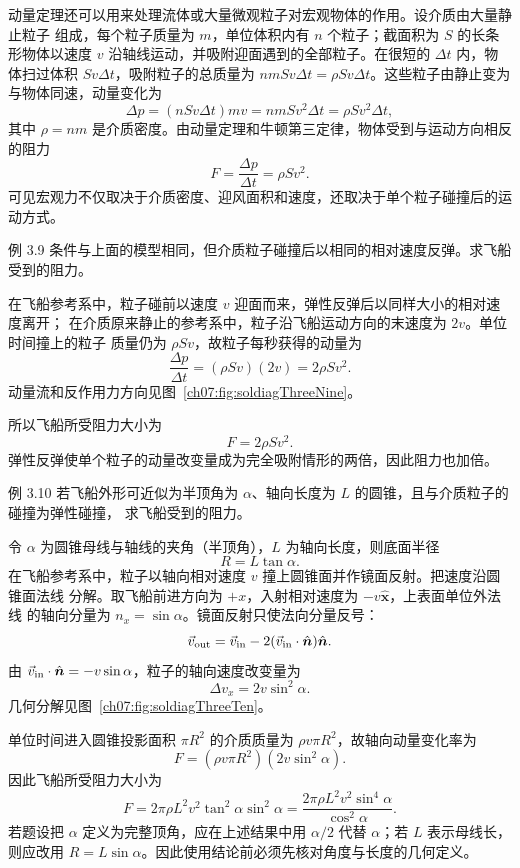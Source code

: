 动量定理还可以用来处理流体或大量微观粒子对宏观物体的作用。设介质由大量静止粒子
组成，每个粒子质量为 $m$，单位体积内有 $n$ 个粒子；截面积为 $S$ 的长条形物体以速度
$v$ 沿轴线运动，并吸附迎面遇到的全部粒子。在很短的 $\Delta t$ 内，物体扫过体积
$Sv\Delta t$，吸附粒子的总质量为 $nmSv\Delta t=\rho Sv\Delta t$。这些粒子由静止变为
与物体同速，动量变化为
\begin{equation}
 \Delta p=(nSv\Delta t)mv=nmSv^2\Delta t
 =\rho Sv^2\Delta t,
\end{equation}
其中 $\rho=nm$ 是介质密度。由动量定理和牛顿第三定律，物体受到与运动方向相反的阻力
\begin{equation}
 F=\frac{\Delta p}{\Delta t}=\rho Sv^2.
\end{equation}
可见宏观力不仅取决于介质密度、迎风面积和速度，还取决于单个粒子碰撞后的运动方式。

\begin{origexamplebox}{例 3.9}
条件与上面的模型相同，但介质粒子碰撞后以相同的相对速度反弹。求飞船受到的阻力。
\end{origexamplebox}

\begin{xesolution}
在飞船参考系中，粒子碰前以速度 $v$ 迎面而来，弹性反弹后以同样大小的相对速度离开；
在介质原来静止的参考系中，粒子沿飞船运动方向的末速度为 $2v$。单位时间撞上的粒子
质量仍为 $\rho Sv$，故粒子每秒获得的动量为
\[
 \frac{\Delta p}{\Delta t}=(\rho Sv)(2v)=2\rho Sv^2.
\]
动量流和反作用力方向见图~\ref{ch07:fig:soldiagThreeNine}。

\soldiagThreeNine
所以飞船所受阻力大小为
\[
 \boxed{F=2\rho Sv^2}.
\]
弹性反弹使单个粒子的动量改变量成为完全吸附情形的两倍，因此阻力也加倍。
\end{xesolution}

\begin{origexamplebox}{例 3.10}
若飞船外形可近似为半顶角为 $\alpha$、轴向长度为 $L$ 的圆锥，且与介质粒子的碰撞为弹性碰撞，
求飞船受到的阻力。
\end{origexamplebox}

\begin{xesolution}
令 $\alpha$ 为圆锥母线与轴线的夹角（半顶角），$L$ 为轴向长度，则底面半径
\[
 R=L\tan\alpha.
\]
在飞船参考系中，粒子以轴向相对速度 $v$ 撞上圆锥面并作镜面反射。把速度沿圆锥面法线
分解。取飞船前进方向为 $+x$，入射相对速度为 $-v\hat{\boldsymbol x}$，上表面单位外法线
的轴向分量为 $n_x=\sin\alpha$。镜面反射只使法向分量反号：
\[
 \vec v_{\rm out}=\vec v_{\rm in}
 -2(\vec v_{\rm in}\cdot\hat{\boldsymbol n})\hat{\boldsymbol n}.
\]
由 $\vec v_{\rm in}\cdot\hat{\boldsymbol n}=-v\sin\alpha$，粒子的轴向速度改变量为
\[
 \Delta v_x=2v\sin^2\alpha.
\]
几何分解见图~\ref{ch07:fig:soldiagThreeTen}。

\soldiagThreeTen
单位时间进入圆锥投影面积 $\pi R^2$ 的介质质量为 $\rho v\pi R^2$，故轴向动量变化率为
\[
 F=(\rho v\pi R^2)(2v\sin^2\alpha).
\]
因此飞船所受阻力大小为
\[
 \boxed{F=2\pi\rho L^2v^2\tan^2\alpha\sin^2\alpha
 =\frac{2\pi\rho L^2v^2\sin^4\alpha}{\cos^2\alpha}}.
\]
若题设把 $\alpha$ 定义为完整顶角，应在上述结果中用 $\alpha/2$ 代替 $\alpha$；若 $L$
表示母线长，则应改用 $R=L\sin\alpha$。因此使用结论前必须先核对角度与长度的几何定义。
\end{xesolution}

